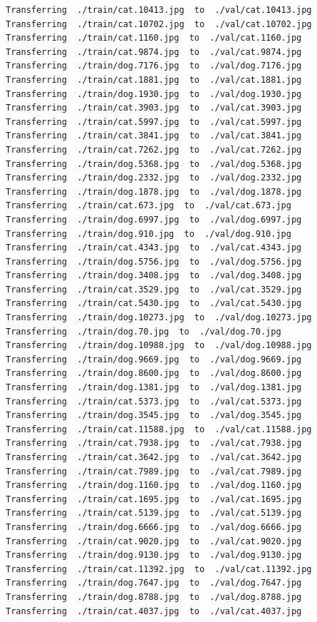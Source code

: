 \documentclass[]{book}
\theoremstyle{definition}
\theoremstyle{definition}
\theoremstyle{definition}
\theoremstyle{remark}
\begin{document}
\begin{verbatim}
Transferring  ./train/cat.10413.jpg  to  ./val/cat.10413.jpg
Transferring  ./train/cat.10702.jpg  to  ./val/cat.10702.jpg
Transferring  ./train/cat.1160.jpg  to  ./val/cat.1160.jpg
Transferring  ./train/cat.9874.jpg  to  ./val/cat.9874.jpg
Transferring  ./train/dog.7176.jpg  to  ./val/dog.7176.jpg
Transferring  ./train/cat.1881.jpg  to  ./val/cat.1881.jpg
Transferring  ./train/dog.1930.jpg  to  ./val/dog.1930.jpg
Transferring  ./train/cat.3903.jpg  to  ./val/cat.3903.jpg
Transferring  ./train/cat.5997.jpg  to  ./val/cat.5997.jpg
Transferring  ./train/cat.3841.jpg  to  ./val/cat.3841.jpg
Transferring  ./train/cat.7262.jpg  to  ./val/cat.7262.jpg
Transferring  ./train/dog.5368.jpg  to  ./val/dog.5368.jpg
Transferring  ./train/dog.2332.jpg  to  ./val/dog.2332.jpg
Transferring  ./train/dog.1878.jpg  to  ./val/dog.1878.jpg
Transferring  ./train/cat.673.jpg  to  ./val/cat.673.jpg
Transferring  ./train/dog.6997.jpg  to  ./val/dog.6997.jpg
Transferring  ./train/dog.910.jpg  to  ./val/dog.910.jpg
Transferring  ./train/cat.4343.jpg  to  ./val/cat.4343.jpg
Transferring  ./train/dog.5756.jpg  to  ./val/dog.5756.jpg
Transferring  ./train/dog.3408.jpg  to  ./val/dog.3408.jpg
Transferring  ./train/cat.3529.jpg  to  ./val/cat.3529.jpg
Transferring  ./train/cat.5430.jpg  to  ./val/cat.5430.jpg
Transferring  ./train/dog.10273.jpg  to  ./val/dog.10273.jpg
Transferring  ./train/dog.70.jpg  to  ./val/dog.70.jpg
Transferring  ./train/dog.10988.jpg  to  ./val/dog.10988.jpg
Transferring  ./train/dog.9669.jpg  to  ./val/dog.9669.jpg
Transferring  ./train/dog.8600.jpg  to  ./val/dog.8600.jpg
Transferring  ./train/dog.1381.jpg  to  ./val/dog.1381.jpg
Transferring  ./train/cat.5373.jpg  to  ./val/cat.5373.jpg
Transferring  ./train/dog.3545.jpg  to  ./val/dog.3545.jpg
Transferring  ./train/cat.11588.jpg  to  ./val/cat.11588.jpg
Transferring  ./train/cat.7938.jpg  to  ./val/cat.7938.jpg
Transferring  ./train/cat.3642.jpg  to  ./val/cat.3642.jpg
Transferring  ./train/cat.7989.jpg  to  ./val/cat.7989.jpg
Transferring  ./train/dog.1160.jpg  to  ./val/dog.1160.jpg
Transferring  ./train/cat.1695.jpg  to  ./val/cat.1695.jpg
Transferring  ./train/cat.5139.jpg  to  ./val/cat.5139.jpg
Transferring  ./train/dog.6666.jpg  to  ./val/dog.6666.jpg
Transferring  ./train/cat.9020.jpg  to  ./val/cat.9020.jpg
Transferring  ./train/dog.9130.jpg  to  ./val/dog.9130.jpg
Transferring  ./train/cat.11392.jpg  to  ./val/cat.11392.jpg
Transferring  ./train/dog.7647.jpg  to  ./val/dog.7647.jpg
Transferring  ./train/dog.8788.jpg  to  ./val/dog.8788.jpg
Transferring  ./train/cat.4037.jpg  to  ./val/cat.4037.jpg

\end{verbatim}
\end{document}
